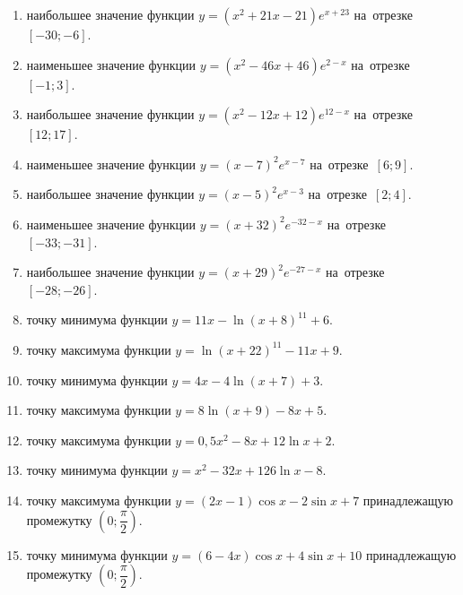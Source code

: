 \documentclass[a4paper,10pt]{article}
\begin{document}
\begin{enumerate}
\item {} наибольшее значение функции $y=\left(x^2 +21x -21\right)e^{x+23}$ на~отрезке~$\left[-30;-6\right]$.

\item {} наименьшее значение функции $y=\left(x^2 -46x +46\right)e^{2-x}$ на~отрезке~$\left[-1;3\right]$.

\item {} наибольшее значение функции $y=\left(x^2 -12x +12\right)e^{12-x}$ на~отрезке~$\left[12;17\right]$.

\item {} наименьшее значение функции $y=\left(x-7\right)^2e^{x-7}$ на~отрезке~$\left[6;9\right]$.

\item {} наибольшее значение функции $y=\left(x-5\right)^2e^{x-3}$ на~отрезке~$\left[2;4\right]$.

\item {} наименьшее значение функции $y=\left(x+32\right)^2e^{-32-x}$ на~отрезке~$\left[-33;-31\right]$.

\item {} наибольшее значение функции $y=\left(x+29\right)^2e^{-27-x}$ на~отрезке~$\left[-28;-26\right]$.

\item {} точку минимума функции $y=11x-\ln\left(x+8\right)^{11}+6$.

\item {} точку максимума функции $y=\ln\left(x+22\right)^{11}-11x+9$.

\item {} точку минимума функции $y=4x-4\ln\left(x+7\right)+3$.

\item {} точку максимума функции $y=8\ln\left(x+9\right)-8x+5$.

\item {} точку максимума функции $y=0,5x^2-8x+12\ln x +2$.

\item {} точку минимума функции $y=x^2-32x+126\ln x -8$.

\item {} точку максимума функции $y=\left(2x-1\right)\cos x -2\sin x+7$
принадлежащую промежутку $\left(0;\dfrac{\pi}{2}\right)$.

\item {} точку минимума функции $y=\left(6-4x\right)\cos x +4\sin x+10$
принадлежащую промежутку $\left(0;\dfrac{\pi}{2}\right)$.


\end{enumerate}
\end{document}
